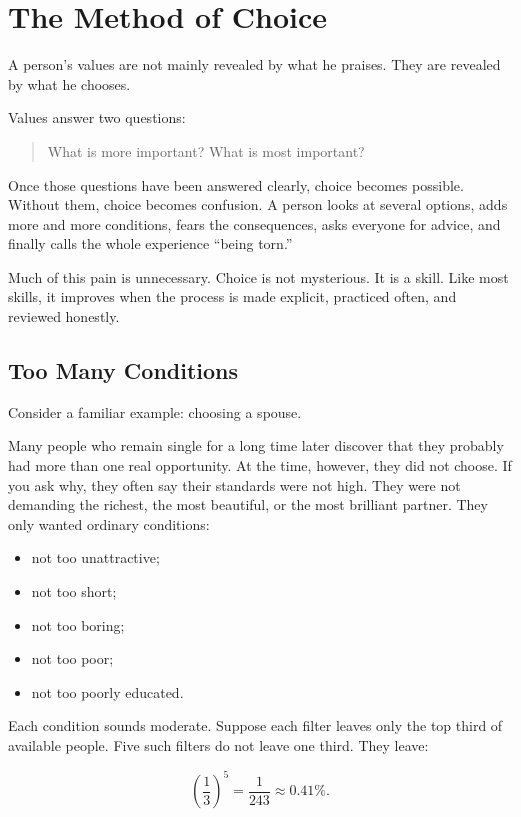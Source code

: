 \chapter{The Method of Choice}

A person's values are not mainly revealed by what he praises. They are revealed by what he chooses.

Values answer two questions:

\begin{quote}
What is more important? What is most important?
\end{quote}

Once those questions have been answered clearly, choice becomes possible. Without them, choice becomes confusion. A person looks at several options, adds more and more conditions, fears the consequences, asks everyone for advice, and finally calls the whole experience ``being torn.''

Much of this pain is unnecessary. Choice is not mysterious. It is a skill. Like most skills, it improves when the process is made explicit, practiced often, and reviewed honestly.

\section*{Too Many Conditions}

Consider a familiar example: choosing a spouse.

Many people who remain single for a long time later discover that they probably had more than one real opportunity. At the time, however, they did not choose. If you ask why, they often say their standards were not high. They were not demanding the richest, the most beautiful, or the most brilliant partner. They only wanted ordinary conditions:

\begin{itemize}
\item not too unattractive;
\item not too short;
\item not too boring;
\item not too poor;
\item not too poorly educated.
\end{itemize}

Each condition sounds moderate. Suppose each filter leaves only the top third of available people. Five such filters do not leave one third. They leave:

\[
\left(\frac{1}{3}\right)^5
=
\frac{1}{243}
\approx 0.41\%.
\]


